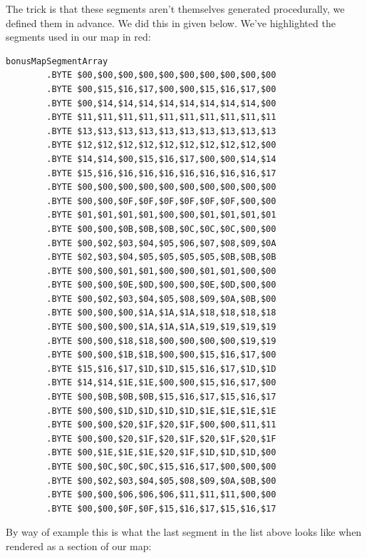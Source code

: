 The trick is that these segments aren't themselves
generated procedurally, we defined them in advance.  We did this in 
given below. We've highlighted the segments used in our map in red:

\begin{lstlisting}
bonusMapSegmentArray
        .BYTE $00,$00,$00,$00,$00,$00,$00,$00,$00,$00
        .BYTE $00,$15,$16,$17,$00,$00,$15,$16,$17,$00
        .BYTE $00,$14,$14,$14,$14,$14,$14,$14,$14,$00
        .BYTE $11,$11,$11,$11,$11,$11,$11,$11,$11,$11
        .BYTE $13,$13,$13,$13,$13,$13,$13,$13,$13,$13
        .BYTE $12,$12,$12,$12,$12,$12,$12,$12,$12,$00
        .BYTE $14,$14,$00,$15,$16,$17,$00,$00,$14,$14
        .BYTE $15,$16,$16,$16,$16,$16,$16,$16,$16,$17
        .BYTE $00,$00,$00,$00,$00,$00,$00,$00,$00,$00
        .BYTE $00,$00,$0F,$0F,$0F,$0F,$0F,$0F,$00,$00
        .BYTE $01,$01,$01,$01,$00,$00,$01,$01,$01,$01
        .BYTE $00,$00,$0B,$0B,$0B,$0C,$0C,$0C,$00,$00
        .BYTE $00,$02,$03,$04,$05,$06,$07,$08,$09,$0A
        .BYTE $02,$03,$04,$05,$05,$05,$05,$0B,$0B,$0B
        .BYTE $00,$00,$01,$01,$00,$00,$01,$01,$00,$00
        .BYTE $00,$00,$0E,$0D,$00,$00,$0E,$0D,$00,$00
        .BYTE $00,$02,$03,$04,$05,$08,$09,$0A,$0B,$00
        .BYTE $00,$00,$00,$1A,$1A,$1A,$18,$18,$18,$18
        .BYTE $00,$00,$00,$1A,$1A,$1A,$19,$19,$19,$19
        .BYTE $00,$00,$18,$18,$00,$00,$00,$00,$19,$19
        .BYTE $00,$00,$1B,$1B,$00,$00,$15,$16,$17,$00
        .BYTE $15,$16,$17,$1D,$1D,$15,$16,$17,$1D,$1D
        .BYTE $14,$14,$1E,$1E,$00,$00,$15,$16,$17,$00
        .BYTE $00,$0B,$0B,$0B,$15,$16,$17,$15,$16,$17
        .BYTE $00,$00,$1D,$1D,$1D,$1D,$1E,$1E,$1E,$1E
        .BYTE $00,$00,$20,$1F,$20,$1F,$00,$00,$11,$11
        .BYTE $00,$00,$20,$1F,$20,$1F,$20,$1F,$20,$1F
        .BYTE $00,$1E,$1E,$1E,$20,$1F,$1D,$1D,$1D,$00
        .BYTE $00,$0C,$0C,$0C,$15,$16,$17,$00,$00,$00
        .BYTE $00,$02,$03,$04,$05,$08,$09,$0A,$0B,$00
        .BYTE $00,$00,$06,$06,$06,$11,$11,$11,$00,$00
        .BYTE $00,$00,$0F,$0F,$15,$16,$17,$15,$16,$17
\end{lstlisting}

By way of example this is what the last segment in the list above looks like when 
rendered as a section of our map:

